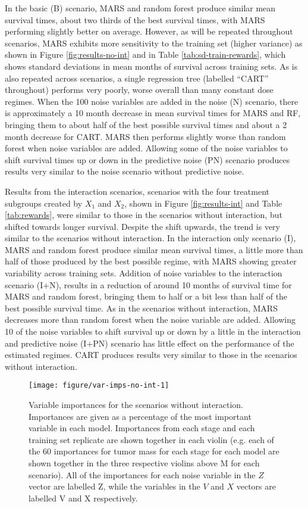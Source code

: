 \documentclass[12pt]{article}
\begin{document}
In the basic (B) scenario, MARS and random forest produce similar mean survival times, about two thirds of the best survival times, with MARS performing slightly better on average. However, as will be repeated throughout scenarios, MARS exhibits more sensitivity to the training set (higher variance) as shown in Figure \ref{fig:results-no-int} and in Table \ref{tab:sd-train-rewards}, which shows standard deviations in mean months of survival across training sets. As is also repeated across scenarios, a single regression tree (labelled ``CART'' throughout) performs very poorly, worse overall than many constant dose regimes. When the 100 noise variables are added in the noise (N) scenario, there is approximately a 10 month decrease in mean survival times for MARS and RF, bringing them to about half of the best possible survival times and about a 2 month decrease for CART. MARS then performs slightly worse than random forest when noise variables are added. Allowing some of the noise variables to shift survival times up or down in the predictive noise (PN) scenario produces results very similar to the noise scenario without predictive noise.

Results from the interaction scenarios, scenarios with the four treatment subgroups created by $X_{1}$ and $X_{2}$, shown in Figure \ref{fig:results-int} and Table \ref{tab:rewards}, were similar to those in the scenarios without interaction, but shifted towards longer survival. Despite the shift upwards, the trend is very similar to the scenarios without interaction. In the interaction only scenario (I), MARS and random forest produce similar mean survival times, a little more than half of those produced by the best possible regime, with MARS showing greater variability across training sets. Addition of noise variables to the interaction scenario (I+N), results in a reduction of around 10 months of survival time for MARS and random forest, bringing them to half or a bit less than half of the best possible survival time. As in the scenarios without interaction, MARS decreases more than random forest when the noise variable are added. Allowing 10 of the noise variables to shift survival up or down by a little in the interaction and predictive noise (I+PN) scenario has little effect on the performance of the estimated regimes. CART produces results very similar to those in the scenarios without interaction.

\begin{figure}[!htbp]
\centering
\texttt{[image: figure/var-imps-no-int-1]}

\caption[Variable importances for the scenarios without interaction]{Variable importances for the scenarios without interaction. Importances are given as a percentage of the most important variable in each model. Importances from each stage and each training set replicate are shown together in each violin (e.g. each of the 60 importances for tumor mass for each stage for each model are shown together in the three respective violins above M for each scenario). All of the importances for each noise variable in the $Z$ vector are labelled Z, while the variables in the $V$ and $X$ vectors are labelled V and X respectively.}\label{fig:var-imps-no-int}
\end{figure}
\end{document}
